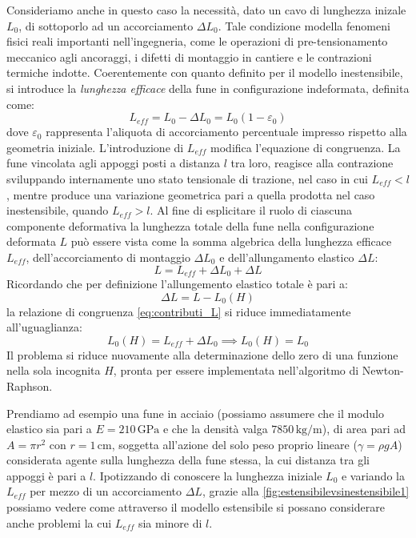Consideriamo anche in questo caso la necessità, dato un cavo di lunghezza inizale $L_0$, di sottoporlo ad un accorciamento $\Delta L_0$. Tale condizione modella fenomeni fisici reali importanti nell'ingegneria, come le operazioni di pre-tensionamento meccanico agli ancoraggi, i difetti di montaggio in cantiere e le contrazioni termiche indotte. Coerentemente con quanto definito per il modello inestensibile, si introduce la \textit{lunghezza efficace} della fune in configurazione indeformata, definita come:
\begin{equation}
    L_{eff} = L_0 - \Delta L_0 = L_0(1 - \varepsilon_0)
    \label{eq:lunghezza_efficace_elastica}
\end{equation}
dove $\varepsilon_0$ rappresenta l'aliquota di accorciamento percentuale impresso rispetto alla geometria iniziale. L'introduzione di $L_{eff}$ modifica l'equazione di congruenza. La fune vincolata agli appoggi posti a distanza $l$ tra loro, reagisce alla contrazione sviluppando internamente uno stato tensionale di trazione, nel caso in cui $L_{eff}<l$, mentre produce una variazione geometrica pari a quella prodotta nel caso inestensibile, quando $L_{eff}>l$. Al fine di esplicitare il ruolo di ciascuna componente deformativa la lunghezza totale della fune nella configurazione deformata $L$ può essere vista come la somma algebrica della lunghezza efficace $L_{eff}$, dell'accorciamento di montaggio $\Delta L_0$ e dell'allungamento elastico $\Delta L$:
\begin{equation}
   L = L_{eff} + \Delta L_0 + \Delta L
   \label{eq:contributi_L}
\end{equation}
Ricordando che per definizione l'allungemento elastico totale è pari a: 
\begin{equation}
   \Delta L = L - L_0(H)
   \label{eq:delta_L}
\end{equation}
la relazione di congruenza \eqref{eq:contributi_L} si riduce immediatamente all'uguaglianza:
\begin{equation}
L_0(H) = L_{eff} + \Delta L_0 \implies L_0(H) = L_0
\end{equation}
Il problema si riduce nuovamente alla determinazione dello zero di una funzione nella sola incognita $H$, pronta per essere implementata nell'algoritmo di Newton-Raphson.

\vspace{1em}
Prendiamo ad esempio una fune in acciaio (possiamo assumere che il modulo elastico sia pari a $E = 210\,\text{GPa}$ e che la densità valga $7850\,\text{kg/m}$), di area pari ad $A = \pi r^{2}$ con $r = 1\,\text{cm}$, soggetta all'azione del solo peso proprio lineare ($\gamma = \rho g A$) considerata agente sulla lunghezza della fune stessa, la cui distanza tra gli appoggi è pari a $l$. Ipotizzando di conoscere la lunghezza iniziale $L_0$ e variando la $L_{eff}$ per mezzo di un accorciamento $\Delta L$, grazie alla \cref{fig:estensibilevsinestensibile1} possiamo vedere come attraverso il modello estensibile si possano considerare anche problemi la cui $L_{eff}$ sia minore di $l$.

